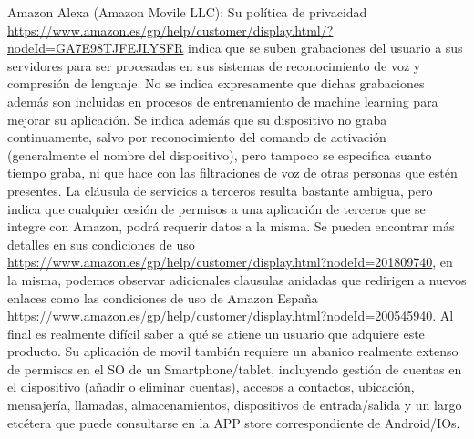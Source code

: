 Amazon Alexa (Amazon Movile LLC): Su política de privacidad \url{https://www.amazon.es/gp/help/customer/display.html/?nodeId=GA7E98TJFEJLYSFR} indica que se suben grabaciones del usuario a sus servidores para ser procesadas en sus sistemas de reconocimiento de voz y compresión de lenguaje. No se indica expresamente que dichas grabaciones además son incluidas en procesos de entrenamiento de machine learning para mejorar su aplicación. Se indica además que su dispositivo no graba continuamente, salvo por reconocimiento del comando de activación (generalmente el nombre del dispositivo), pero tampoco se especifica cuanto tiempo graba, ni que hace con las filtraciones de voz de otras personas que estén presentes. La cláusula de servicios a terceros resulta bastante ambigua, pero indica que cualquier cesión de permisos a una aplicación de terceros que se integre con Amazon, podrá requerir datos a la misma. Se pueden encontrar más detalles en sus condiciones de uso \url{https://www.amazon.es/gp/help/customer/display.html?nodeId=201809740}, en la misma, podemos observar adicionales clausulas anidadas que redirigen a nuevos enlaces como las condiciones de uso de Amazon España \url{https://www.amazon.es/gp/help/customer/display.html?nodeId=200545940}. Al final es realmente difícil saber a qué se atiene un usuario que adquiere este producto. Su aplicación de movil también requiere un abanico realmente extenso de permisos en el SO de un Smartphone/tablet, incluyendo gestión de cuentas en el dispositivo (añadir o eliminar cuentas), accesos a contactos, ubicación, mensajería, llamadas, almacenamientos, dispositivos de entrada/salida y un largo etcétera que puede consultarse en la APP store correspondiente de Android/IOs.

